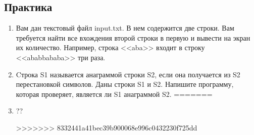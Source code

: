 \documentclass[12pt]{article}
\begin{document}
\subsection*{Практика}
\begin{enumerate}
<<<<<<< HEAD
\item Вам дан текстовый файл input.txt. В нем содержится две строки. Вам требуется найти все вхождения второй строки в первую и вывести на экран их количество. Например, строка <<aba>> входит в строку <<ababbababa>> три раза.

\item Cтрока S1 называется анаграммой строки S2, если она получается из S2 перестановкой символов. Даны строки S1 и S2. Напишите программу, которая проверяет, является ли S1 анаграммой S2.
=======
\item ??


>>>>>>> 8332441a41bec39b900068e996c0432230f725dd
\end{enumerate}
\end{document}

